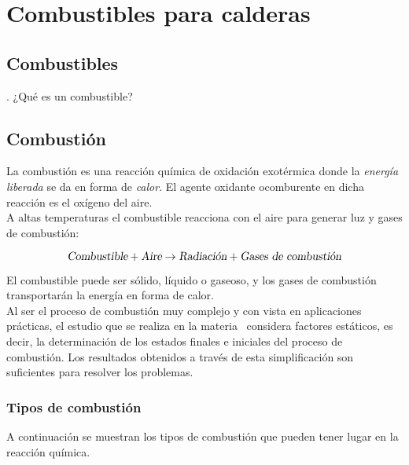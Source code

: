 \section{Combustibles para calderas}
\subsection{Combustibles}

\begin{preguntas}
	. ¿Qué es un combustible?
\end{preguntas}

\subsection{Combustión}

La combustión es una reacción química de oxidación exotérmica donde la \textsl{energía liberada} se da en forma de \textsl{calor}. El agente oxidante ocomburente en dicha reacción es el oxígeno del aire.\\

A altas temperaturas el combustible reacciona con el aire para generar luz y gases de combustión:

\begin{equation}
	\textsl{Combustible} + \textsl{Aire} \rightarrow \textsl{Radiación} + \textsl{Gases de combustión}
\end{equation}


El combustible puede ser sólido, líquido o gaseoso, y los gases de combustión transportarán la energía en forma de calor.\\

Al ser el proceso de combustión muy complejo y con vista en aplicaciones prácticas, el estudio que se realiza en la materia \materia\ considera factores estáticos, es decir, la determinación de los estados finales e iniciales del proceso de combustión. Los resultados obtenidos a través de esta simplificación son suficientes para resolver los problemas.

\subsubsection{Tipos de combustión}

A continuación se muestran los tipos de combustión que pueden tener lugar en la reacción química.

